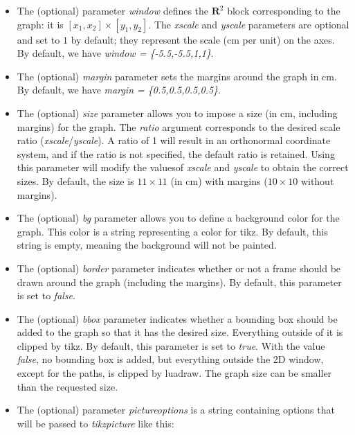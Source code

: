 \begin{itemize}
\item The (optional) parameter \emph{window} defines the $\mathbf R^2$ block corresponding to the graph: it is $[x_1,x_2]\times[y_1,y_2]$. The \emph{xscale} and \emph{yscale} parameters are optional and set to $1$ by default; they represent the scale (cm per unit) on the axes. By default, we have \emph{window = \{-5.5,-5.5,1,1\}}.

\item The (optional) \emph{margin} parameter sets the margins around the graph in cm. By default, we have \emph{margin = \{0.5,0.5,0.5,0.5\}}.

\item The (optional) \emph{size} parameter allows you to impose a size (in cm, including margins) for the graph. The \emph{ratio} argument corresponds to the desired scale ratio (\emph{xscale}/\emph{yscale}). A ratio of 1 will result in an orthonormal coordinate system, and if the ratio is not specified, the default ratio is retained. Using this parameter will modify the values ​​of \emph{xscale} and \emph{yscale} to obtain the correct sizes. By default, the size is $11\times 11$ (in cm) with margins ($10\times 10$ without margins).

\item The (optional) \emph{bg} parameter allows you to define a background color for the graph. This color is a string representing a color for tikz. By default, this string is empty, meaning the background will not be painted.

\item The (optional) \emph{border} parameter indicates whether or not a frame should be drawn around the graph (including the margins). By default, this parameter is set to \emph{false}.

\item The (optional) \emph{bbox} parameter indicates whether a bounding box should be added to the graph so that it has the desired size. Everything outside of it is clipped by tikz. By default, this parameter is set to \emph{true}. With the value \emph{false}, no bounding box is added, but everything outside the 2D window, except for the paths, is clipped by luadraw. The graph size can be smaller than the requested size.

\item The (optional) parameter \emph{pictureoptions} is a string containing options that will be passed to \emph{tikzpicture} like this:
\begin{TeXcode}
\begin{tikzpicture}[line join=round <,pictureoptions>]
\end{TeXcode}
\end{itemize}


